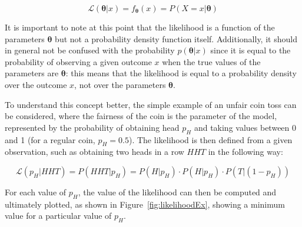 \documentclass[a4paper, 11pt]{report}
\begin{document}
\begin{equation}
\label{eq:likelihood}
\mathcal{L}(\bm \theta | x) = f_{\bm \theta}(x) = P(X = x | \bm \theta)
\end{equation}

It is important to note at this point that the likelihood is a function of the parameters $\bm \theta$ but not a probability density function itself. Additionally, it should in general not be confused with the probability $p(\bm \theta | x)$ since it is equal to the probability of observing a given outcome $x$ when the true values of the parameters are $\bm \theta$: this means that the likelihood is equal to a probability density over the outcome $x$, not over the parameters $\bm \theta$.

To understand this concept better, the simple example of an unfair coin toss can be considered, where the fairness of the coin is the parameter of the model, represented by the probability of obtaining head $p_H$ and taking values between 0 and 1 (for a regular coin, $p_H = 0.5$). The likelihood is then defined from a given observation, such as obtaining two heads in a row $HHT$ in the following way:

\begin{equation}
\label{eq:likelihoodEx}
\mathcal{L}(p_H | HHT) = P(HHT | p_H) = P(H | p_H) \cdot P(H | p_H) \cdot P(T | (1-p_H))
\end{equation}

For each value of $p_H$, the value of the likelihood can then be computed and ultimately plotted, as shown in Figure~\ref{fig:likelihoodEx}, showing a minimum value for a particular value of $p_H$.
\end{document}
